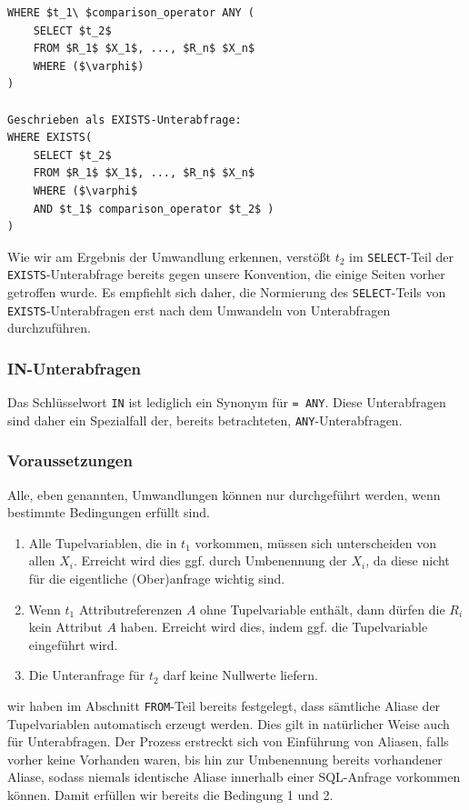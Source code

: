 \begin{lstlisting}[mathescape]
WHERE $t_1\ $comparison_operator ANY (
	SELECT $t_2$
	FROM $R_1$ $X_1$, ..., $R_n$ $X_n$
	WHERE ($\varphi$) 
) 

Geschrieben als EXISTS-Unterabfrage:
WHERE EXISTS( 
	SELECT $t_2$
	FROM $R_1$ $X_1$, ..., $R_n$ $X_n$
	WHERE ($\varphi$ 
	AND $t_1$ comparison_operator $t_2$ )
)
\end{lstlisting}

Wie wir am Ergebnis der Umwandlung erkennen, verstößt $t_2$ im \verb|SELECT|-Teil der \verb|EXISTS|-Unterabfrage bereits gegen unsere Konvention, die einige Seiten vorher getroffen wurde. Es empfiehlt sich daher, die Normierung des \verb|SELECT|-Teils von \verb|EXISTS|-Unterabfragen erst nach dem Umwandeln von Unterabfragen durchzuführen.


\subsubsection*{IN-Unterabfragen}

Das Schlüsselwort \verb|IN| ist lediglich ein Synonym für \verb|= ANY|. Diese Unterabfragen sind daher ein Spezialfall der, bereits betrachteten, \verb|ANY|-Unterabfragen.

\subsubsection*{Voraussetzungen}

Alle, eben genannten, Umwandlungen können nur durchgeführt werden, wenn bestimmte Bedingungen erfüllt sind.

\begin{enumerate}
\item Alle Tupelvariablen, die in $t_1$ vorkommen, müssen sich unterscheiden von allen $X_i$. Erreicht wird dies ggf. durch Umbenennung der $X_i$, da diese nicht für die eigentliche (Ober)anfrage wichtig sind.
\item Wenn $t_1$ Attributreferenzen $A$ ohne Tupelvariable enthält, dann dürfen die $R_i$ kein Attribut $A$ haben. Erreicht wird dies, indem ggf. die Tupelvariable eingeführt wird.
\item Die Unteranfrage für $t_2$ darf keine Nullwerte liefern. 
\end{enumerate}

wir haben im Abschnitt \verb|FROM|-Teil bereits festgelegt, dass sämtliche Aliase der Tupelvariablen automatisch erzeugt werden. Dies gilt in natürlicher Weise auch für Unterabfragen. Der Prozess erstreckt sich von Einführung von Aliasen, falls vorher keine Vorhanden waren, bis hin zur Umbenennung bereits vorhandener Aliase, sodass niemals identische Aliase innerhalb einer SQL-Anfrage vorkommen können. Damit erfüllen wir bereits die Bedingung 1 und 2. 

